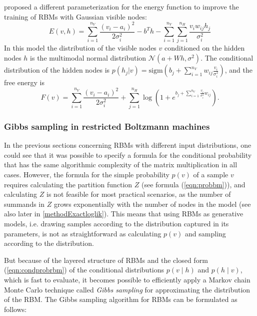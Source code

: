 \documentclass[12pt]{article}
\newcommand{\sigm}{\mathrm{sigm}}
\begin{document}
\cite{cho2011improved} proposed a different parameterization for the energy function to improve the training of RBMs with Gaussian visible nodes:
\begin{equation}
   E(v,h) = \sum_{i=1}^{n_V}\frac{(v_i - a_i)^2}{2\sigma_i^2} - b^T h - \sum_{i=1}^{n_V} \sum_{j=1}^{n_H} \frac{v_i w_{ij} h_j}{\sigma_i^2}
   \label{eqn:energyformulagbrbm2}
\end{equation}
In this model the distribution of the visible nodes $v$ conditioned on the hidden nodes $h$ is the multimodal normal distribution $\mathcal{N}(a + Wh, \sigma^2)$.
The conditional distribution of the hidden nodes is $p(h_j | v) = \sigm \left (b_j + \sum_{i=1}^{n_V} w_{ij} \frac{v_i}{\sigma_i^2} \right )$, and the free energy is
\begin{equation*}
   F(v) = \sum_{i=1}^{n_V}\frac{(v_i - a_i)^2}{2\sigma_i^2} + \sum_{j=1}^{n_H} \log \left (1 + e^{b_j + \sum_{i=1}^{n_V} \frac{v_i}{\sigma_i^2} w_{ij}} \right).
\end{equation*}



\subsubsection{Gibbs sampling in restricted Boltzmann machines}\label{gibbssamplingrbm}
In the previous sections concerning RBMs with different input distributions, one could see that it was possible to specify a formula for the conditional probability that has the same  algorithmic complexity of the matrix multiplication in all cases.
However, the formula for the simple probability $p(v)$ of a sample $v$ requires calculating the partition function $Z$ (see formula (\ref{eqn:probbm})), and calculating $Z$ is not feasible for most practical scenarios, as the number of summands in $Z$ grows exponentially with the number of nodes in the model (see also later in \ref{methodExactloglik}).
This means that using RBMs as generative models, i.e. drawing samples according to the distribution captured in its parameters, is not as straightforward as calculating $p(v)$ and sampling according to the distribution.

But because of the layered structure of RBMs and the closed form (\ref{eqn:condprobrbm}) of the conditional distributions $p(v \mid h)$ and $p(h \mid v)$, which is fast to evaluate, it becomes possible to efficiently apply a Markov chain Monte Carlo technique \citep{mcmc_handbook_2011} called \emph{Gibbs sampling} \citep{gibbssamplingorig} for approximating the distribution of the RBM.
The Gibbs sampling  algorithm for RBMs can be formulated as follows:
\end{document}
